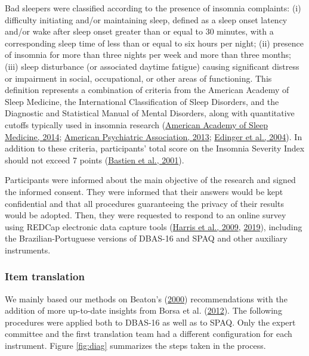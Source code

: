 \documentclass[
  ,doc,11pt, twoside,floatsintext]{apa6}
\begin{document}
Bad sleepers were classified according to the presence of insomnia complaints: (i) difficulty initiating and/or maintaining sleep, defined as a sleep onset latency and/or wake after sleep onset greater than or equal to 30 minutes, with a corresponding sleep time of less than or equal to six hours per night; (ii) presence of insomnia for more than three nights per week and more than three months; (iii) sleep disturbance (or associated daytime fatigue) causing significant distress or impairment in social, occupational, or other areas of functioning. This definition represents a combination of criteria from the American Academy of Sleep Medicine, the International Classification of Sleep Disorders, and the Diagnostic and Statistical Manual of Mental Disorders, along with quantitative cutoffs typically used in insomnia research (\protect\hyperlink{ref-icds2014}{American Academy of Sleep Medicine, 2014}; \protect\hyperlink{ref-americanpsychiatricassociation2013}{American Psychiatric Association, 2013}; \protect\hyperlink{ref-edinger2004}{Edinger et al., 2004}). In addition to these criteria, participants' total score on the Insomnia Severity Index should not exceed 7 points (\protect\hyperlink{ref-bastien2001}{Bastien et al., 2001}).

Participants were informed about the main objective of the research and signed the informed consent. They were informed that their answers would be kept confidential and that all procedures guaranteeing the privacy of their results would be adopted. Then, they were requested to respond to an online survey using REDCap electronic data capture tools (\protect\hyperlink{ref-harris2009research}{Harris et al., 2009}, \protect\hyperlink{ref-harris2019redcap}{2019}), including the Brazilian-Portuguese versions of DBAS-16 and SPAQ and other auxiliary instruments.

\hypertarget{item-translation}{%
\subsubsection{Item translation}\label{item-translation}}

We mainly based our methods on Beaton's (\protect\hyperlink{ref-beaton2000}{2000}) recommendations with the addition of more up-to-date insights from Borsa et al. (\protect\hyperlink{ref-borsaAdaptacaoValidacaoInstrumentos2012}{2012}). The following procedures were applied both to DBAS-16 as well as to SPAQ. Only the expert committee and the first translation team had a different configuration for each instrument.
Figure \ref{fig:diag} summarizes the steps taken in the process.
\end{document}
